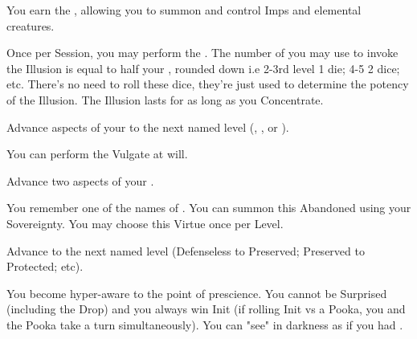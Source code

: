 \begin{multicols*}{2}

You earn the , allowing you to summon and control Imps and elemental creatures.


Once per Session, you may perform the . The number of \DICE you may use to invoke the Illusion is equal to half your \LVL, rounded down i.e 2-3rd level 1 die; 4-5 2 dice; etc. There's no need to roll these dice, they're just used to determine the potency of the Illusion. The Illusion lasts for as long as you Concentrate.




Advance  aspects of your  to the next named level (\DEATH, \INJURY, or \INSANITY).


You can perform the  Vulgate at will.



Advance two  aspects of your  \DCUP.



You remember one of the names of . You can summon this Abandoned using your Sovereignty. You may choose this Virtue once per Level. 


Advance   to the next named level (Defenseless to Preserved; Preserved to Protected; etc).



 You become hyper-aware to the point of prescience.  You cannot be Surprised (including the Drop) and you always win Init (if rolling Init vs a Pooka, you and the Pooka take a turn simultaneously). You can "see" in darkness as if you had .

\end{multicols*}

